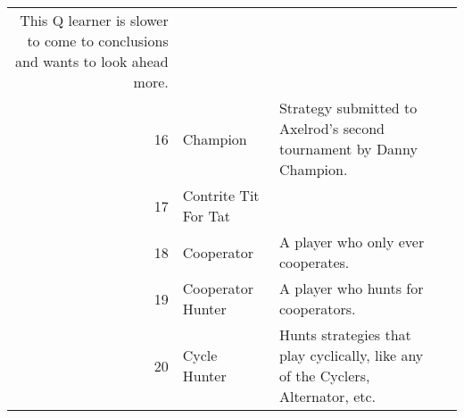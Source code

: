 \begin{table}[H]
\begin{adjustbox}{height=0.7\textwidth, width=1.1\textwidth}
\begin{tabular}{rlll}
	This Q learner is slower to come to conclusions and wants to look ahead more.                                                                                                                                                                                                                                                                                                                                                                                                                                                                                                                                                                                                                                                                                                                                                                                                                                                             \\
	16   & Champion                    & Strategy submitted to Axelrod's second tournament by Danny Champion.                                                              \\
	17   & Contrite Tit For Tat        &                                                                                                                                   \\
	18   & Cooperator                  & A player who only ever cooperates.                                                                                                \\
	19   & Cooperator Hunter           & A player who hunts for cooperators.                                                                                               \\
	20   & Cycle Hunter                & Hunts strategies that play cyclically, like any of the Cyclers,
	                                       Alternator, etc.                                                                                                                                                                                                                                                                                                                                                                                                                                                                                                                                                                                                                                                                                                                                                                                                                                                                                                                                     \\

\end{tabular}
\end{adjustbox}
\end{table}
